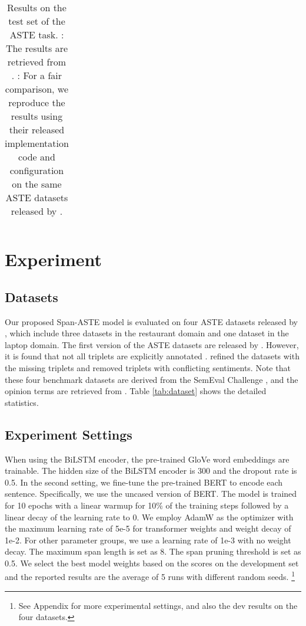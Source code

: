 \documentclass[11pt,a4paper]{article}
\begin{document}
\begin{table*}[!t]
{\begin{tabular}{llcccccccccccc}
\bottomrule
    \end{tabular}
    }
\caption{
    Results on the test set of the ASTE task. 
    : The results are retrieved from \citet{Xu2020PositionAwareTF}.
    : For a fair comparison, we reproduce the results using their released implementation code and configuration on the same ASTE datasets released by \citet{Xu2020PositionAwareTF}.
} 
    \label{tab:main_results}
\end{table*}



\section{Experiment}
\subsection{Datasets}

Our proposed Span-ASTE model is evaluated on four ASTE datasets released by \citet{Xu2020PositionAwareTF}, which include three datasets in the restaurant domain and one dataset in the laptop domain. The first version of the ASTE datasets are released by \citet{peng2019knowing}. However, it is found that not all triplets are explicitly annotated \cite{Xu2020PositionAwareTF, wu-etal-2020-grid}.  \citet{Xu2020PositionAwareTF} refined the datasets with the missing triplets and removed triplets with conflicting sentiments.  Note that these four benchmark datasets are derived from the SemEval Challenge \cite{pontiki-EtAl:2014:SemEval, pontiki-etal-2015-semeval, pontiki2016semeval}, and the opinion terms are retrieved from \cite{fan2019target}. Table \ref{tab:dataset} shows the detailed statistics.




\subsection{Experiment Settings}
When using the BiLSTM encoder, the pre-trained GloVe word embeddings are trainable.
The hidden size of the BiLSTM encoder is 300 and the dropout rate is 0.5.
In the second setting, we fine-tune the pre-trained BERT \cite{devlin2019bert} to encode each sentence.
Specifically, we use the 
{uncased version of BERT}.
The 
model is trained for 10 epochs with a linear warmup for 10\% of the training steps followed by a linear decay of the learning rate to 0.
We employ AdamW as the optimizer with the maximum learning rate of 5e-5 for transformer weights and weight decay of 1e-2. For other parameter groups, we use a learning rate of 1e-3 with no weight decay. 
The maximum span length  is set as 8.
The span pruning threshold  is set as 0.5.
We select the best model 
weights based on the  scores on the development set and the reported results are the average of 5 runs with different random seeds.
\footnote{See Appendix for more experimental settings, and also the dev results on the four datasets.}
\end{document}
